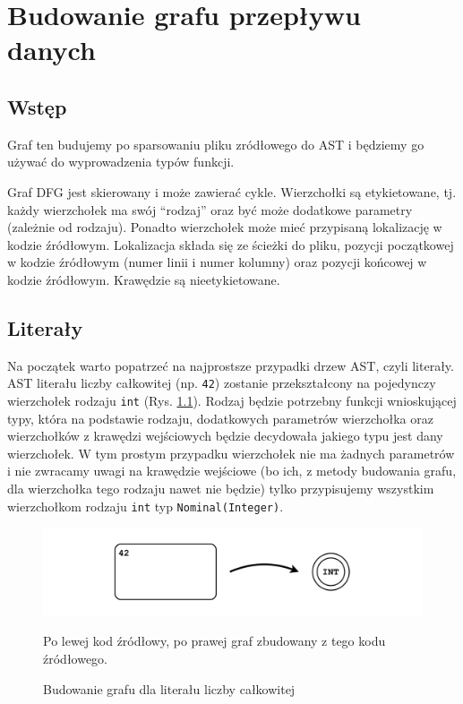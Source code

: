 \documentclass[declaration,shortabstract,mgr]{iithesis}
\begin{document}
\chapter{Budowanie grafu przepływu danych}


\section{Wstęp}


Graf ten budujemy po sparsowaniu pliku zródłowego do AST i będziemy go używać do wyprowadzenia typów funkcji.

Graf DFG jest skierowany i może zawierać cykle. Wierzchołki są etykietowane, tj. każdy wierzchołek ma swój ``rodzaj'' oraz być może dodatkowe parametry (zależnie od rodzaju). Ponadto wierzchołek może mieć przypisaną lokalizację w kodzie źródłowym. Lokalizacja składa się ze ścieżki do pliku, pozycji początkowej w kodzie źródłowym (numer linii i numer kolumny) oraz pozycji końcowej w kodzie źródłowym. Krawędzie są nieetykietowane.

\section{Literały}

Na początek warto popatrzeć na najprostsze przypadki drzew AST, czyli literały. AST literału liczby całkowitej (np. \texttt{42}) zostanie przekształcony na pojedynczy wierzchołek rodzaju \texttt{int} (Rys. \ref{fig:graph-int}). Rodzaj będzie potrzebny funkcji wnioskującej typy, która na podstawie rodzaju, dodatkowych parametrów wierzchołka oraz wierzchołków z krawędzi wejściowych będzie decydowała jakiego typu jest dany wierzchołek. W tym prostym przypadku wierzchołek nie ma żadnych parametrów i nie zwracamy uwagi na krawędzie wejściowe (bo ich, z metody budowania grafu, dla wierzchołka tego rodzaju nawet nie będzie) tylko przypisujemy wszystkim wierzchołkom rodzaju \texttt{int} typ \texttt{Nominal(Integer)}.

\begin{figure}[htb]
	\centering
	\includegraphics[scale=0.4]{imgs/msc-int.png}
	\caption{Budowanie grafu dla literału liczby całkowitej}
        Po lewej kod źródłowy, po prawej graf zbudowany z tego kodu źródłowego.
	\label{fig:graph-int}
\end{figure}
\end{document}
